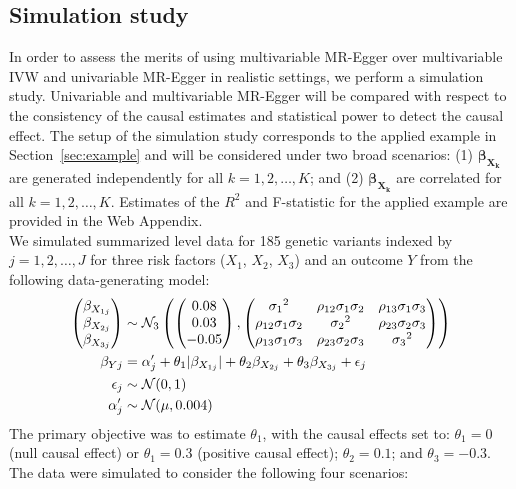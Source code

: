 \documentclass[a4paper,12pt]{article}
\begin{document}
\begin{bibunit}[wileyj]
\section{Simulation study}
\label{sec:simulation}
In order to assess the merits of using multivariable MR-Egger over multivariable IVW and univariable MR-Egger in realistic settings, we perform a simulation study. Univariable and multivariable MR-Egger will be compared with respect to the consistency of the causal estimates and statistical power to detect the causal effect.  The setup of the simulation study corresponds to the applied example in Section~\ref{sec:example} and will be considered under two broad scenarios: (1) $\boldsymbol{\beta_{X_{k}}}$ are generated independently for all $k = 1, 2, \ldots, K$; and (2) $\boldsymbol{\beta_{X_{k}}}$ are correlated for all $k = 1, 2, \ldots, K$.  Estimates of the $R^{2}$ and F-statistic for the applied example are provided in the Web Appendix.\\

We simulated summarized level data for 185 genetic variants indexed by $j=1,2, \ldots, J$ for three risk factors ($X_{1}$, $X_{2}$, $X_{3}$) and an outcome $Y$ from the following data-generating model:
\begin{align}
\left(\begin{matrix}
\beta_{X_{1j}} \\
\beta_{X_{2j}} \\
\beta_{X_{3j}}
\end{matrix}\right)
&\sim \mathcal{N}_3\left(\left(\begin{matrix}
0.08 \\
0.03 \\
-0.05 \\
\end{matrix}\right),\left(\begin{matrix}
{\sigma_{1}}^{2} & \rho_{12}\sigma_{1}\sigma_{2} & \rho_{13}\sigma_{1}\sigma_{3} \\
\rho_{12}\sigma_{1}\sigma_{2} & {\sigma_{2}}^{2} & \rho_{23}\sigma_{2}\sigma_{3} \\
\rho_{13}\sigma_{1}\sigma_{3} & \rho_{23}\sigma_{2}\sigma_{3} & {\sigma_{3}}^{2}\\
\end{matrix}\right) \right) \notag \\
\beta_{Yj} &= \alpha'_{j} + \theta_{1}|\beta_{X_{1j}}| + \theta_{2}\beta_{X_{2j}} + \theta_{3}\beta_{X_{3j}} +\epsilon_{j} \notag \\
\epsilon_{j} &\sim \mathcal{N}(0,1) \notag \\
\alpha'_{j} &\sim \mathcal{N}(\mu,0.004) \label{eq:datgen}
\end{align}
The primary objective was to estimate $\theta_{1}$, with the causal effects set to: $\theta_{1}=0$ (null causal effect) or $\theta_{1}=0.3$ (positive causal effect); $\theta_{2}=0.1$; and $\theta_{3}=-0.3$. The data were simulated to consider the following four scenarios: \\


\end{bibunit}
\end{document}
